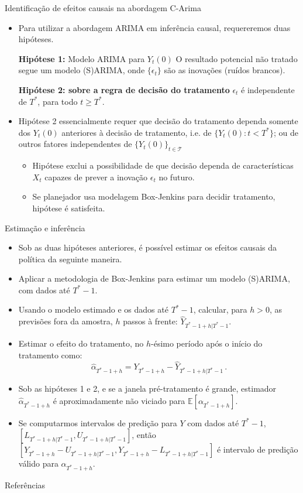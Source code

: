 \documentclass[11pt]{beamer}
\newenvironment{wideitemize}{\itemize\addtolength{\itemsep}{10pt}}{\enditemize}
\begin{document}
\begin{frame}{Identificação de efeitos causais na abordagem C-Arima}
\begin{itemize}
	\item Para utilizar a abordagem ARIMA em inferência causal, requereremos duas hipóteses.
	\begin{block}{\textbf{Hipótese 1:} Modelo ARIMA para $Y_{t}(0)$}
		O resultado potencial não tratado segue um modelo (S)ARIMA, onde $\{\epsilon_t\}$ são as inovações (ruídos brancos).
	\end{block}
		\begin{block}{\textbf{Hipótese 2: sobre a regra de decisão do tratamento}}
		$\epsilon_{t}$ é independente de $T^*$, para todo $t\geq T^*$.
	\end{block}
	\item Hipótese 2 essencialmente requer que decisão do tratamento dependa somente dos $Y_t(0)$ anteriores à decisão de tratamento, i.e. de $\{Y_t(0):  t < T^*\}$; ou de outros fatores independentes de $\{Y_t(0)\}_{t \in \mathcal{T}}$
	\begin{itemize}
		\item Hipótese exclui a possibilidade de que decisão dependa de características $X_t$ capazes de prever a inovação $\epsilon_t$ no futuro.
		\item Se planejador usa modelagem Box-Jenkins para decidir tratamento, hipótese é satisfeita.
	\end{itemize}
	
\end{itemize}
\end{frame}
\begin{frame}{Estimação e inferência}
	\begin{itemize}
		\item Sob as duas hipóteses anteriores, é possível estimar os efeitos causais da política da seguinte maneira.
		\begin{wideitemize}
			\item Aplicar a metodologia de Box-Jenkins para estimar um modelo (S)ARIMA, {\color{red}com dados até $T^*-1$}.
			\item Usando o modelo estimado e os dados até $T^*-1$, calcular, para $h > 0$, as previsões fora da amostra, $h$ passos à frente: $\hat{Y}_{T^*-1+h|T^*-1}$.
			\item Estimar o efeito do tratamento, no $h$-ésimo período após o início do tratamento como:
			$$\hat \alpha_{T^*-1+h}  = Y_{T^*-1+h} - \hat{Y}_{T^*-1+h|T^*-1} \, .$$
		\end{wideitemize}
		\item Sob as hipóteses 1 e 2, e se a janela pré-tratamento é grande, estimador $\hat \alpha_{T^*-1+h}$ é aproximadamente não viciado para $\mathbb{E}[\alpha_{T^*-1+h}]$.
		\item Se computarmos intervalos de predição para $Y$ com dados até $T^*-1$, $[L_{T^*-1+h|T^*-1},U_{T^*-1+h|T^*-1}]$, então  $[Y_{T^*-1+h} - U_{T^*-1+h|T^*-1},Y_{T^*-1+h} - L_{T^*-1+h|T^*-1}]$ é intervalo de predição válido para $\alpha_{T^*-1+h}$.
	\end{itemize}
\end{frame}
\appendix
\begin{frame}{Referências}
	\printbibliography
\end{frame}
\end{document}
